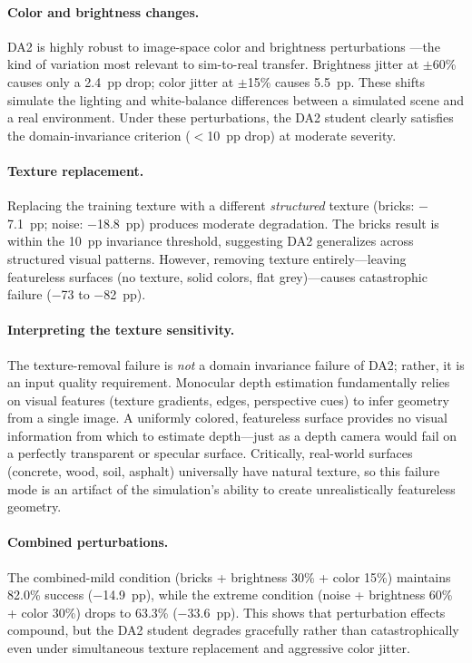\paragraph{Color and brightness changes.}
DA2 is highly robust to image-space color and brightness perturbations
---the kind of variation most relevant to sim-to-real transfer.
Brightness jitter at $\pm$60\% causes only a 2.4~pp drop;
color jitter at $\pm$15\% causes 5.5~pp.  These shifts simulate
the lighting and white-balance differences between a simulated
scene and a real environment.  Under these perturbations, the DA2
student clearly satisfies the domain-invariance criterion ($<$10~pp
drop) at moderate severity.

\paragraph{Texture replacement.}
Replacing the training texture with a different \emph{structured}
texture (bricks: $-$7.1~pp; noise: $-$18.8~pp) produces moderate
degradation.  The bricks result is within the 10~pp invariance
threshold, suggesting DA2 generalizes across structured visual
patterns.  However, removing texture entirely---leaving featureless
surfaces (no texture, solid colors, flat grey)---causes catastrophic
failure ($-$73 to $-$82~pp).

\paragraph{Interpreting the texture sensitivity.}
The texture-removal failure is \emph{not} a domain invariance
failure of DA2; rather, it is an input quality requirement.
Monocular depth estimation fundamentally relies on visual features
(texture gradients, edges, perspective cues) to infer geometry from
a single image.  A uniformly colored, featureless surface provides
no visual information from which to estimate depth---just as a
depth camera would fail on a perfectly transparent or specular
surface.  Critically, real-world surfaces (concrete, wood, soil,
asphalt) universally have natural texture, so this failure mode
is an artifact of the simulation's ability to create unrealistically
featureless geometry.

\paragraph{Combined perturbations.}
The combined-mild condition (bricks + brightness 30\% + color 15\%)
maintains 82.0\% success ($-$14.9~pp), while the extreme condition
(noise + brightness 60\% + color 30\%) drops to 63.3\% ($-$33.6~pp).
This shows that perturbation effects compound, but the DA2 student
degrades gracefully rather than catastrophically even under
simultaneous texture replacement and aggressive color jitter.

